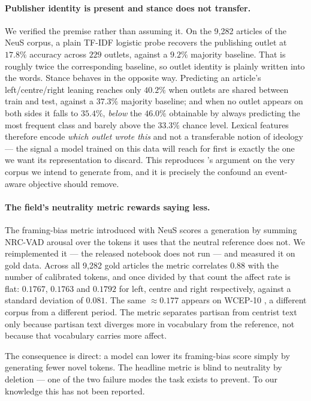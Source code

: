 \documentclass[10pt,twocolumn,a4paper]{article}
\begin{document}
\paragraph{Publisher identity is present and stance does not transfer.}
We verified the premise rather than assuming it. On the 9{,}282 articles of the
NeuS corpus, a plain TF-IDF logistic probe recovers the publishing outlet at
$17.8\%$ accuracy across $229$ outlets, against a $9.2\%$ majority baseline.
That is roughly twice the corresponding baseline, so outlet identity is plainly
written into the words. Stance behaves in the opposite way. Predicting an
article's left/centre/right leaning reaches only $40.2\%$ when outlets are shared
between train and test, against a $37.3\%$ majority baseline; and when no outlet
appears on both sides it falls to $35.4\%$, \emph{below} the $46.0\%$ obtainable
by always predicting the most frequent class and barely above the $33.3\%$ chance
level. Lexical features therefore encode \emph{which outlet wrote this} and not a
transferable notion of ideology --- the signal a model trained on this data will
reach for first is exactly the one we want its representation to discard. This
reproduces \citeauthor{baly2020detect}'s argument on the very corpus we intend to
generate from, and it is precisely the confound an event-aware objective should
remove.

\paragraph{The field's neutrality metric rewards saying less.}
The framing-bias metric introduced with NeuS scores a generation by summing
NRC-VAD \cite{mohammad2018vad} arousal over the tokens it uses that the neutral
reference does not. We reimplemented it --- the released notebook does not run
--- and measured it on gold data. Across all 9{,}282 gold articles the metric
correlates $0.88$ with the number of calibrated tokens, and once divided by that
count the affect rate is flat: $0.1767$, $0.1763$ and $0.1792$ for left, centre
and right respectively, against a standard deviation of $0.081$. The same
$\approx\!0.177$ appears on WCEP-10 \cite{ghalandari2020wcep}, a different corpus
from a different period. The metric separates partisan from centrist text only
because partisan text diverges more in vocabulary from the reference, not because
that vocabulary carries more affect.

The consequence is direct: a model can lower its framing-bias score simply by
generating fewer novel tokens. The headline metric is blind to neutrality by
deletion --- one of the two failure modes the task exists to prevent. To our
knowledge this has not been reported.
\end{document}
